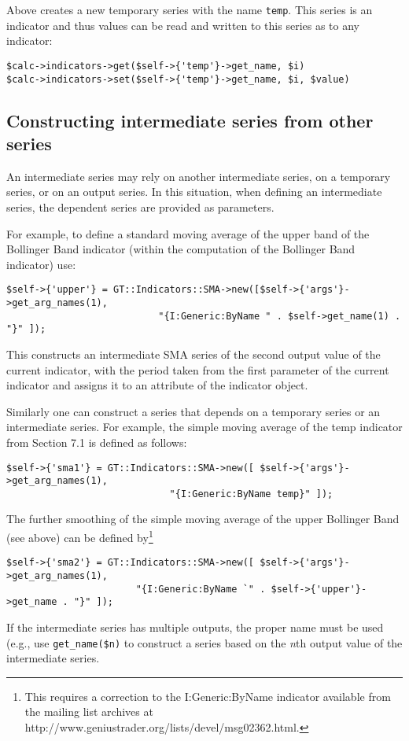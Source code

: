 \documentclass[11pt,twoside]{article}
\begin{document}
Above creates a new temporary series with the name
\lstinline!temp!. This series is an indicator and thus values
can be read and written to this series as to any indicator:
\begin{lstlisting}[numbers=none]
$calc->indicators->get($self->{'temp'}->get_name, $i)
$calc->indicators->set($self->{'temp'}->get_name, $i, $value)
\end{lstlisting}

\subsection[Constructing intermediate series from other
series]{\label{bkm:Ref192502529}Constructing intermediate series from
other series}
An intermediate series may rely on another intermediate series, on a
temporary series, or on an output series. In this situation, when
defining an intermediate series, the dependent series are provided as
parameters.

For example, to define a standard moving average of the upper band of
the Bollinger Band indicator (within the computation of the Bollinger Band indicator) use:
\begin{lstlisting}[numbers=none]
$self->{'upper'} = GT::Indicators::SMA->new([$self->{'args'}->get_arg_names(1),
                           "{I:Generic:ByName " . $self->get_name(1) . "}" ]);
\end{lstlisting}

This constructs an intermediate SMA series of the second output value of
the current indicator, with the period taken from the first parameter
of the current indicator and assigns it to an attribute of the
indicator object.

Similarly one can construct a series that depends on a temporary series
or an intermediate series. For example, the simple moving average of the
temp indicator from Section 7.1 is defined as follows:
\begin{lstlisting}[numbers=none]
$self->{'sma1'} = GT::Indicators::SMA->new([ $self->{'args'}->get_arg_names(1),
                             "{I:Generic:ByName temp}" ]);
\end{lstlisting}
The further smoothing of the simple moving average of the upper Bollinger
Band (see above) can be defined by\footnote{This requires a correction 
to the I:Generic:ByName indicator available from the mailing list archives 
at http://www.geniustrader.org/lists/devel/msg02362.html.}
\begin{lstlisting}[numbers=none]
$self->{'sma2'} = GT::Indicators::SMA->new([ $self->{'args'}->get_arg_names(1),
                       "{I:Generic:ByName `" . $self->{'upper'}->get_name . "}" ]);
\end{lstlisting}
If the intermediate series has multiple outputs, the proper name must be used
(e.g., use \lstinline!get_name($n)! to construct a series based on the 
{\em n}th output value of the intermediate series.
\end{document}

